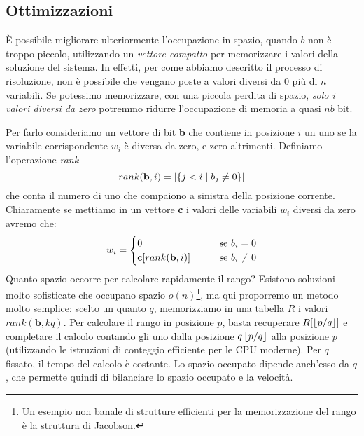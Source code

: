 \subsection{Ottimizzazioni}
È possibile migliorare ulteriormente l'occupazione in spazio, quando $b$ non è troppo piccolo, utilizzando un \textit{vettore compatto} per memorizzare i valori della soluzione del sistema. In effetti, per come abbiamo descritto il processo di risoluzione, non è possibile che vengano poste a valori diversi da 0 più di $n$ variabili. Se potessimo memorizzare, con una piccola perdita di spazio, \textit{solo i valori diversi da zero} potremmo ridurre l'occupazione di memoria a quasi $nb$ bit.

Per farlo consideriamo un vettore di bit \textbf{b} che contiene in posizione $i$ un uno se la variabile corrispondente $w_i$ è diversa da zero, e zero altrimenti. Definiamo l'operazione \textit{rank}
\begin{equation*}
    rank(\textbf{b}, i) = |\{j < i \hspace{1mm}|\hspace{1mm} b_j \neq 0\}|
\end{equation*}
che conta il numero di uno che compaiono a sinistra della posizione corrente. Chiaramente se mettiamo in un vettore \textbf{c} i valori delle variabili $w_i$ diversi da zero avremo che:
\begin{equation*}
    w_i =
    \begin{cases}
        0 \hspace{7mm} &\textnormal{se } b_i = 0\\
        \textbf{c}[rank(\textbf{b}, i)] \hspace{7mm} &\textnormal{se } b_i \neq 0\\
    \end{cases}
\end{equation*}
Quanto spazio occorre per calcolare rapidamente il rango? Esistono soluzioni molto sofisticate che occupano spazio $o(n)$\footnote{Un esempio non banale di strutture efficienti per la memorizzazione del rango è la struttura di Jacobson.}, ma qui proporremo un metodo molto semplice: scelto un quanto $q$, memorizziamo in una tabella $R$ i valori $rank(\textbf{b}, kq)$. Per calcolare il rango in posizione $p$, basta recuperare $R[\left\lfloor p / q \right\rfloor]$ e completare il calcolo contando gli uno dalla posizione $q\left\lfloor p / q \right\rfloor$ alla posizione $p$ (utilizzando le istruzioni di conteggio efficiente per le CPU moderne). Per $q$ fissato, il tempo del calcolo è costante. Lo spazio occupato dipende anch'esso da $q$, che permette quindi di bilanciare lo spazio occupato e la velocità.

